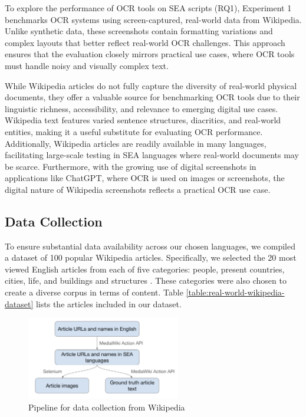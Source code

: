 \documentclass[12pt,oneside]{memoir}
\begin{document}
To explore the performance of OCR tools on SEA scripts (RQ1), Experiment 1 benchmarks OCR systems using screen-captured, real-world data from Wikipedia.
Unlike synthetic data, these screenshots contain formatting variations and complex layouts that better reflect real-world OCR challenges. 
This approach ensures that the evaluation closely mirrors practical use cases, where OCR tools must handle noisy and visually complex text.

While Wikipedia articles do not fully capture the diversity of real-world physical documents, they offer a valuable source for benchmarking OCR tools due to their linguistic richness, accessibility, and relevance to emerging digital use cases. Wikipedia text features varied sentence structures, diacritics, and real-world entities, making it a useful substitute for evaluating OCR performance. Additionally, Wikipedia articles are readily available in many languages, facilitating large-scale testing in SEA languages where real-world documents may be scarce. Furthermore, with the growing use of digital screenshots in applications like ChatGPT, where OCR is used on images or screenshots, the digital nature of Wikipedia screenshots reflects a practical OCR use case.

\subsection{Data Collection}

To ensure substantial data availability across our chosen languages, we compiled a dataset of 100 popular Wikipedia articles. Specifically, we selected the 20 most viewed English articles from each of five categories: people, present countries, cities, life, and buildings and structures \parencite{wikipedia-popular-pages-2024}.
These categories were also chosen to create a diverse corpus in terms of content. 
Table \ref{table:real-world-wikipedia-dataset} lists the articles included in our dataset.

\begin{figure}[ht]
    \centering
    \includegraphics[width=0.6\textwidth]{images/data-collection.png}
    \caption{Pipeline for data collection from Wikipedia}
    \label{figure:data-collection}
\end{figure}
\end{document}
